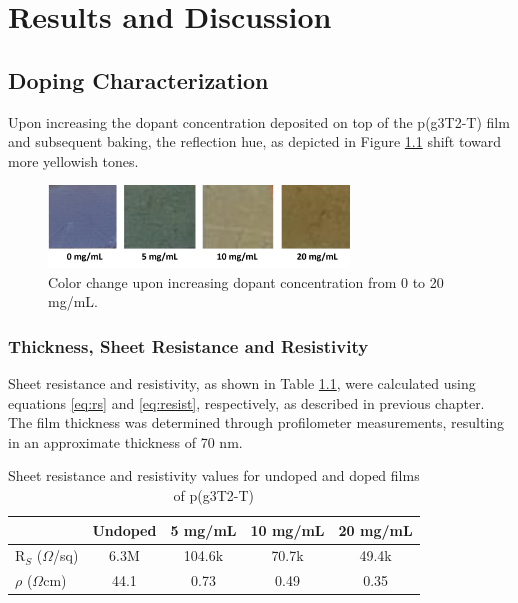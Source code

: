 \chapter{Results and Discussion}
\label{cha:3}

\section{Doping Characterization}

Upon increasing the dopant concentration deposited on top of the p(g3T2-T) film and subsequent baking, the reflection hue, as depicted in Figure \ref{fig:color} shift toward more yellowish tones.

\begin{figure}[ht]
  \centering
  \includegraphics[width=8cm]{Images/pdf/doping_color.pdf}
  \caption[Color shift upon doping level increase]{Color change upon increasing dopant concentration from 0 to 20 mg/mL.
  \label{fig:color}}
\end{figure}

\subsection{Thickness, Sheet Resistance and Resistivity}

Sheet resistance and resistivity, as shown in Table \ref{tab:res}, were calculated using equations \ref{eq:rs} and \ref{eq:resist}, respectively, as described in previous chapter. The film thickness was determined through profilometer measurements, resulting in an approximate thickness of 70 nm.

\begin{table}[ht]
\centering
\caption{Sheet resistance and resistivity values for undoped and doped films of p(g3T2-T)}
\begin{tabular}{l|c|c|c|c}
& Undoped & 5 mg/mL & 10 mg/mL & 20 mg/mL \\\hline
R$_{S}$ ($\Omega$/sq) & 6.3M & 104.6k & 70.7k & 49.4k\\
$\rho$ ($\Omega$cm) & 44.1 & 0.73 & 0.49 & 0.35\\\hline
\end{tabular}
\label{tab:res}
\end{table}

